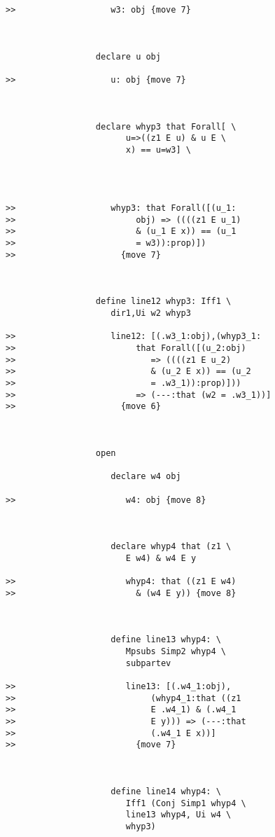 \documentclass[12pt]{article}
\begin{document}
\begin{verbatim}
>>                   w3: obj {move 7}



                  declare u obj

>>                   u: obj {move 7}



                  declare whyp3 that Forall[ \
                        u=>((z1 E u) & u E \
                        x) == u=w3] \
                     



>>                   whyp3: that Forall([(u_1:
>>                        obj) => ((((z1 E u_1)
>>                        & (u_1 E x)) == (u_1
>>                        = w3)):prop)])
>>                     {move 7}



                  define line12 whyp3: Iff1 \
                     dir1,Ui w2 whyp3

>>                   line12: [(.w3_1:obj),(whyp3_1:
>>                        that Forall([(u_2:obj)
>>                           => ((((z1 E u_2)
>>                           & (u_2 E x)) == (u_2
>>                           = .w3_1)):prop)]))
>>                        => (---:that (w2 = .w3_1))]
>>                     {move 6}



                  open

                     declare w4 obj

>>                      w4: obj {move 8}



                     declare whyp4 that (z1 \
                        E w4) & w4 E y

>>                      whyp4: that ((z1 E w4)
>>                        & (w4 E y)) {move 8}



                     define line13 whyp4: \
                        Mpsubs Simp2 whyp4 \
                        subpartev

>>                      line13: [(.w4_1:obj),
>>                           (whyp4_1:that ((z1
>>                           E .w4_1) & (.w4_1
>>                           E y))) => (---:that
>>                           (.w4_1 E x))]
>>                        {move 7}



                     define line14 whyp4: \
                        Iff1 (Conj Simp1 whyp4 \
                        line13 whyp4, Ui w4 \
                        whyp3)


\end{verbatim}
\end{document}
